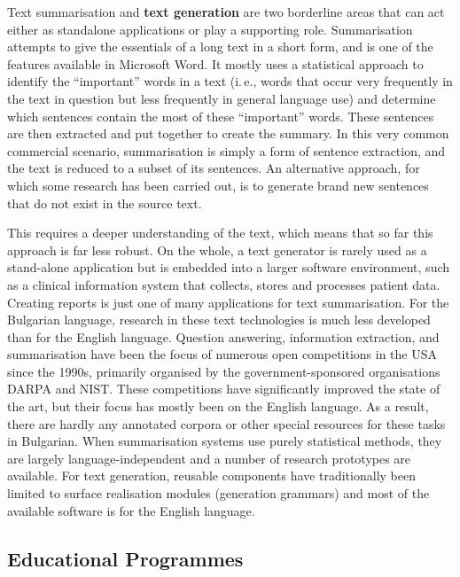 \begin{multicols}{2}
  Text summarisation and \textbf{text generation} are two borderline areas that can act either as standalone applications or play a supporting role. Summarisation attempts to give the essentials of a long text in a short form, and is one of the features available in Microsoft Word. It mostly uses a statistical approach to identify the “important” words in a text (i.\,e., words that occur very frequently in the text in question but less frequently in general language use) and determine which sentences contain the most of these “important” words. These sentences are then extracted and put together to create the summary. In this very common commercial scenario, summarisation is simply a form of sentence extraction, and the text is reduced to a subset of its sentences. An alternative approach, for which some research has been carried out, is to generate brand new sentences that do not exist in the source text.


  This requires a deeper understanding of the text, which means that so far this approach is far less robust. On the whole, a text generator is rarely used as a stand-alone application but is embedded into a larger software environment, such as a clinical information system that collects, stores and processes patient data. Creating reports is just one of many applications for text summarisation. 
  For the Bulgarian language, research in these text technologies is much less developed than for the English language. Question answering, information extraction, and summarisation have been the focus of numerous open competitions in the USA since the 1990s, primarily organised by the government-sponsored organisations DARPA and NIST. These competitions have significantly improved the state of the art, but their focus has mostly been on the English language. As a result, there are hardly any annotated corpora or other special resources for these tasks in Bulgarian. When summarisation systems use purely statistical methods, they are largely language-independent and a number of research prototypes are available. For text generation, reusable components have traditionally been limited to surface realisation modules (generation grammars) and most of the available software is for the English language. 

  \subsection{Educational Programmes}


\end{multicols}
